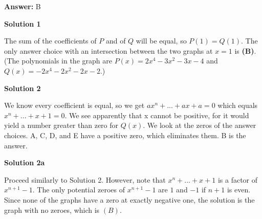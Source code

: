 \begin{enumerate}
 \textbf{Answer: }B



\textbf{Solution 1}

The sum of the coefficients of $P$ and of $Q$ will be equal, so $P(1) = Q(1)$. The only answer choice with an intersection between the two graphs at $x = 1$ is \textbf{(B)}. (The polynomials in the graph are $P(x) = 2x^4-3x^2-3x-4$ and $Q(x) = -2x^4-2x^2-2x-2$.)

 



\textbf{Solution 2}

We know every coefficient is equal, so we get $ax^n + ... + ax + a = 0$ which equals $x^n + ... + x + 1 = 0$. We see apparently that x cannot be positive, for it would yield a number greater than zero for $Q(x)$. We look at the zeros of the answer choices. A, C, D, and E have a positive zero, which eliminates them. B is the answer.

 



\textbf{Solution 2a}

Proceed similarly to Solution 2. However, note that $x^n + ... + x + 1$ is a factor of $x^{n+1}-1.$ The only potential zeroes of $x^{n+1}-1$ are $1$ and $-1$ if $n+1$ is even.  Since none of the graphs have a zero at exactly negative one, the solution is the graph with no zeroes, which is $\boxed{(B)}.$



\end{enumerate}